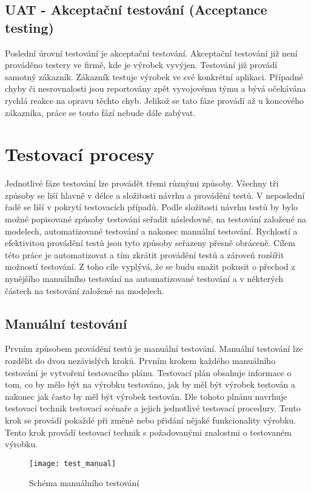 \subsection{UAT - Akceptační testování (Acceptance testing)}
Poslední úrovní testování je akceptační testování. Akceptační testování již není prováděno testery ve firmě, kde je výrobek vyvýjen. Testování již provádí samotný zákazník. Zákazník testuje výrobek ve své konkrétní aplikaci. Případné chyby či nesrovnalosti jsou reportovány zpět vyvojovému týmu a bývá očekávána rychlá reakce na opravu těchto chyb. Jelikož se tato fáze provádí až u koncového zákazníka, práce se touto fází nebude dále zabývat.


\section{Testovací procesy}
Jednotlivé fáze testování lze provádět třemi různými způsoby. Všechny tři způsoby se liší hlavně v délce a složitosti návrhu a provádění testů. V neposlední řadě se liší v pokrytí testovacích případů. Podle složitosti návrhu testů by bylo možné popisované způsoby testování seřadit následovně, na testování založené na modelech, automatizované testování a nakonec manuální testování. Rychlostí a efektivitou provádění testů jsou tyto způsoby seřazeny přesně obráceně. Cílem této práce je automatizovat a tím zkrátit provádění testů a zároveň rozšířit možností testování. Z toho cíle vyplývá, že se budu snažit pokusit o přechod z nynějšího manuálního testování na automatizované testování a v některých částech na testování založené na modelech.

\subsection{Manuální testování}
Prvním způsobem provádění testů je manuální testování. Manuální testování lze rozdělit do dvou nezávislých kroků. Prvním krokem každého manuálního testování je vytvoření testovacího plánu. Testovací plán obsahuje informace o tom, co by mělo být na výrobku testováno, jak by měl být výrobek testován a nakonec jak často by měl být výrobek testován. Dle tohoto plnánu navrhuje testovací technik testovací scénaře a jejich jednotlivé testovací procedury. Tento krok se provádí pokaždé při změně nebo přidání nějaké funkcionality výrobku. Tento krok provádí testovací technik s požadovanými znalostmi o testovaném výrobku.

\begin{figure}[h]
  \centering
  \texttt{[image: test\_manual]}
  \caption{Schéma manuálního testování}
  \label{fig:test_manual}
\end{figure}

